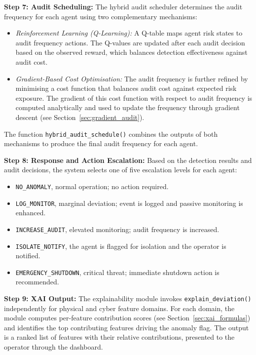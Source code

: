 \par \vspace{0.35cm}
\noindent
\textbf{Step 7: Audit Scheduling:} The hybrid audit scheduler determines the audit frequency for each agent using two complementary mechanisms:
\begin{itemize}
    \item \textit{Reinforcement Learning (Q-Learning):} A Q-table maps agent risk states to audit frequency actions. The Q-values are updated after each audit decision based on the observed reward, which balances detection effectiveness against audit cost.
    \item \textit{Gradient-Based Cost Optimisation:} The audit frequency is further refined by minimising a cost function that balances audit cost against expected risk exposure. The gradient of this cost function with respect to audit frequency is computed analytically and used to update the frequency through gradient descent (see Section~\ref{sec:gradient_audit}).
\end{itemize}
The function \texttt{hybrid\_audit\_schedule()} combines the outputs of both mechanisms to produce the final audit frequency for each agent.

\par \vspace{0.35cm}
\noindent
\textbf{Step 8: Response and Action Escalation:} Based on the detection results and audit decisions, the system selects one of five escalation levels for each agent:
\begin{itemize}
    \item \texttt{NO\_ANOMALY}, normal operation; no action required.
    \item \texttt{LOG\_MONITOR}, marginal deviation; event is logged and passive monitoring is enhanced.
    \item \texttt{INCREASE\_AUDIT}, elevated monitoring; audit frequency is increased.
    \item \texttt{ISOLATE\_NOTIFY}, the agent is flagged for isolation and the operator is notified.
    \item \texttt{EMERGENCY\_SHUTDOWN}, critical threat; immediate shutdown action is recommended.
\end{itemize}

\par \vspace{0.35cm}
\noindent
\textbf{Step 9: XAI Output:} The explainability module invokes \texttt{explain\_deviation()} independently for physical and cyber feature domains. For each domain, the module computes per-feature contribution scores (see Section~\ref{sec:xai_formulas}) and identifies the top contributing features driving the anomaly flag. The output is a ranked list of features with their relative contributions, presented to the operator through the dashboard.

